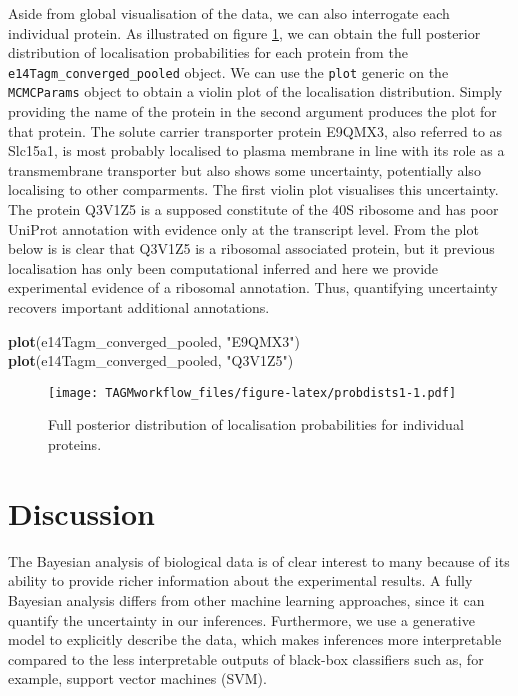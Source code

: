 \documentclass[]{article}
\newenvironment{Shaded}{\begin{snugshade}}{\end{snugshade}}
\newcommand{\KeywordTok}[1]{\textcolor[rgb]{0.13,0.29,0.53}{\textbf{{#1}}}}
\newcommand{\StringTok}[1]{\textcolor[rgb]{0.31,0.60,0.02}{{#1}}}
\newcommand{\NormalTok}[1]{{#1}}
\begin{document}
Aside from global visualisation of the data, we can also interrogate
each individual protein. As illustrated on figure \ref{fig:probdists1},
we can obtain the full posterior distribution of localisation
probabilities for each protein from the
\texttt{e14Tagm\_converged\_pooled} object. We can use the \texttt{plot}
generic on the \texttt{MCMCParams} object to obtain a violin plot of the
localisation distribution. Simply providing the name of the protein in
the second argument produces the plot for that protein. The solute
carrier transporter protein E9QMX3, also referred to as Slc15a1, is most
probably localised to plasma membrane in line with its role as a
transmembrane transporter but also shows some uncertainty, potentially
also localising to other comparments. The first violin plot visualises
this uncertainty. The protein Q3V1Z5 is a supposed constitute of the 40S
ribosome and has poor UniProt annotation with evidence only at the
transcript level. From the plot below is is clear that Q3V1Z5 is a
ribosomal associated protein, but it previous localisation has only been
computational inferred and here we provide experimental evidence of a
ribosomal annotation. Thus, quantifying uncertainty recovers important
additional annotations.

\begin{Shaded}
\begin{Highlighting}[]
\KeywordTok{plot}\NormalTok{(e14Tagm_converged_pooled, }\StringTok{"E9QMX3"}\NormalTok{)}
\KeywordTok{plot}\NormalTok{(e14Tagm_converged_pooled, }\StringTok{"Q3V1Z5"}\NormalTok{)}
\end{Highlighting}
\end{Shaded}

\begin{figure}[htbp]
\centering
\texttt{[image: TAGMworkflow\_files/figure-latex/probdists1-1.pdf]}
\caption{\label{fig:probdists1}Full posterior distribution of localisation
probabilities for individual proteins.}
\end{figure}

\section{Discussion}\label{discussion}

The Bayesian analysis of biological data is of clear interest to many
because of its ability to provide richer information about the
experimental results. A fully Bayesian analysis differs from other
machine learning approaches, since it can quantify the uncertainty in
our inferences. Furthermore, we use a generative model to explicitly
describe the data, which makes inferences more interpretable compared to
the less interpretable outputs of black-box classifiers such as, for
example, support vector machines (SVM).
\end{document}
